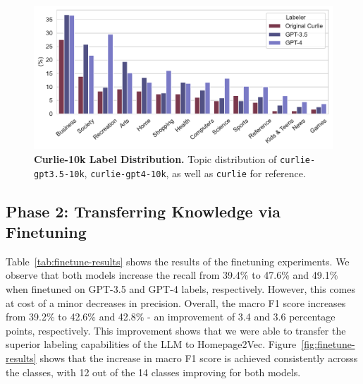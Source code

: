 \begin{figure}[!ht]
    \centering
    \includegraphics[width=.8\columnwidth]{figures/curlie-10k-dist.pdf}
    \caption{\textbf{Curlie-10k Label Distribution.} Topic distribution of \texttt{curlie-gpt3.5-10k}, \texttt{curlie-gpt4-10k}, as well as \texttt{curlie} for reference.}
    \label{fig:curlie-10k-dist}
\end{figure}

\subsection*{Phase 2: Transferring Knowledge via Finetuning}


Table~\ref{tab:finetune-results} shows the results of the finetuning experiments. We observe that both models increase the recall from 39.4\% to 47.6\% and 49.1\% when finetuned on GPT-3.5 and GPT-4 labels, respectively. However, this comes at cost of a minor decreases in precision. Overall, the macro F1 score increases from 39.2\% to 42.6\% and 42.8\% - an improvement of 3.4 and 3.6 percentage points, respectively.
This improvement shows that we were able to transfer the superior labeling capabilities of the LLM to Homepage2Vec. Figure~\ref{fig:finetune-results} shows that the increase in macro F1 score is achieved consistently acrosss the classes, with 12 out of the 14 classes improving for both models.




